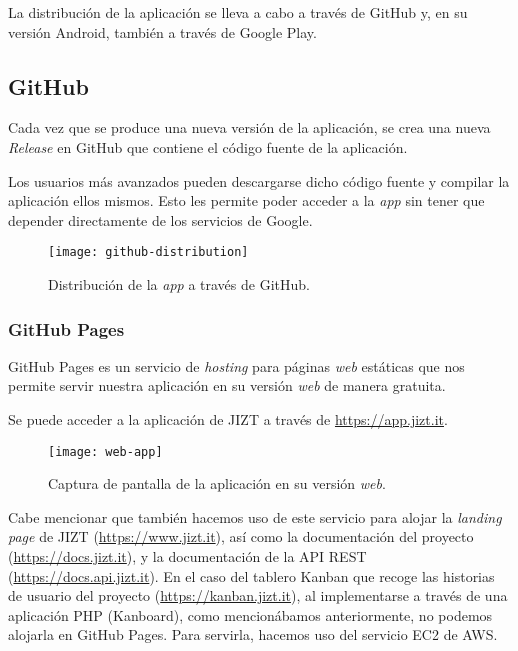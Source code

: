 La distribución de la aplicación se lleva a cabo a través de GitHub y, en su versión Android, también a través de Google Play.

\subsection{GitHub}

Cada vez que se produce una nueva versión de la aplicación, se crea una nueva \emph{Release} en GitHub que contiene el código fuente de la aplicación.

Los usuarios más avanzados pueden descargarse dicho código fuente y compilar la aplicación ellos mismos. Esto les permite poder acceder a la \emph{app} sin tener que depender directamente de los servicios de Google.

\begin{figure}[h]
	\centering
	\texttt{[image: github-distribution]}
	\caption[Distribución de la \emph{app} a través de GitHub.]{Distribución de la \emph{app} a través de GitHub.}
\end{figure}

\newpage

\subsubsection{GitHub Pages}

GitHub Pages es un servicio de \emph{hosting} para páginas \emph{web} estáticas que nos permite servir nuestra aplicación en su versión \emph{web} de manera gratuita.

Se puede acceder a la aplicación de JIZT a través de \href{https://dmlls.github.io/jizt-tfg-app}{https://app.jizt.it}.


\begin{figure}[h]
	\centering
	\texttt{[image: web-app]}
	\caption{Captura de pantalla de la aplicación en su versión \emph{web}.}
\end{figure}

Cabe mencionar que también hacemos uso de este servicio para alojar la \emph{landing page} de JIZT (\href{https://dmlls.github.io/jizt-tfg-website.it}{https://www.jizt.it}), así como la documentación del proyecto (\href{https://dmlls.github.io/jizt-tfg}{https://docs.jizt.it}), y la documentación de la API REST (\href{https://dmlls.github.io/jizt-tfg-api-docs}{https://docs.api.jizt.it}). En el caso del tablero Kanban que recoge las historias de usuario del proyecto (\href{https://web.archive.org/web/20210224162004/https://board.jizt.it/public/board/c08ea3322e2876652a0581e79d6430e2dc0c27720d8a06d7853e84c3cd2b}{https://kanban.jizt.it}), al implementarse a través de una aplicación PHP (Kanboard), como mencionábamos anteriormente, no podemos alojarla en GitHub Pages. Para servirla, hacemos uso del servicio EC2 de AWS.


